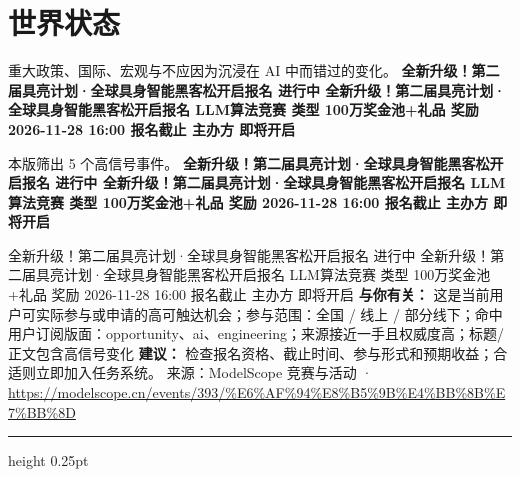 \documentclass[10.5pt]{ctexart}
\begin{document}
\section*{世界状态}
{\color{ormuted} 重大政策、国际、宏观与不应因为沉浸在 AI 中而错过的变化。}
\vspace{2mm}
{\LARGE\bfseries 全新升级！第二届具亮计划·全球具身智能黑客松开启报名 进行中 全新升级！第二届具亮计划·全球具身智能黑客松开启报名 LLM算法竞赛 类型 100万奖金池+礼品 奖励 2026-11-28 16:00 报名截止 主办方 即将开启}\par
\vspace{1mm}
{\color{ormuted} 本版筛出 5 个高信号事件。}
\vspace{3mm}
{\Large\bfseries 全新升级！第二届具亮计划·全球具身智能黑客松开启报名 进行中 全新升级！第二届具亮计划·全球具身智能黑客松开启报名 LLM算法竞赛 类型 100万奖金池+礼品 奖励 2026-11-28 16:00 报名截止 主办方 即将开启}\par
全新升级！第二届具亮计划·全球具身智能黑客松开启报名 进行中 全新升级！第二届具亮计划·全球具身智能黑客松开启报名 LLM算法竞赛 类型 100万奖金池+礼品 奖励 2026-11-28 16:00 报名截止 主办方 即将开启
\textbf{与你有关：} 这是当前用户可实际参与或申请的高可触达机会；参与范围：全国 / 线上 / 部分线下；命中用户订阅版面：opportunity、ai、engineering；来源接近一手且权威度高；标题/正文包含高信号变化
\textbf{建议：} 检查报名资格、截止时间、参与形式和预期收益；合适则立即加入任务系统。
{\footnotesize\color{ormuted} 来源：ModelScope 竞赛与活动 · \url{https://modelscope.cn/events/393/%E6%AF%94%E8%B5%9B%E4%BB%8B%E7%BB%8D}}
\vspace{4mm}
\hrule height 0.25pt
\vspace{3mm}
\end{document}
